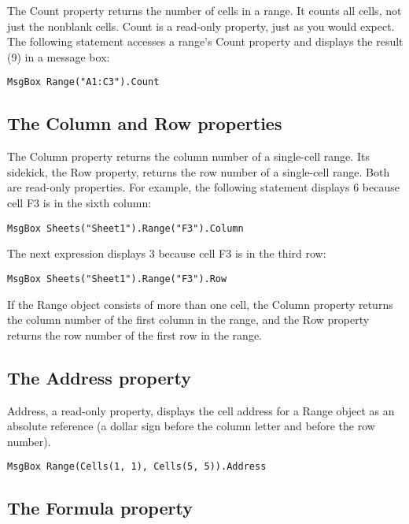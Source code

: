 \documentclass[
]{article}
\theoremstyle{definition}
\theoremstyle{definition}
\theoremstyle{definition}
\theoremstyle{definition}
\theoremstyle{remark}
\begin{document}
The Count property returns the number of cells in a range. It counts all cells, not just the nonblank cells. Count is a read-only property, just as you would expect. The following statement accesses a range's Count property and displays the result (9) in a message box:

\begin{verbatim}
MsgBox Range("A1:C3").Count
\end{verbatim}

\hypertarget{the-column-and-row-properties}{%
\subsection{The Column and Row properties}\label{the-column-and-row-properties}}

The Column property returns the column number of a single-cell range. Its sidekick, the Row property, returns the row number of a single-cell range. Both are read-only properties. For example, the following
statement displays 6 because cell F3 is in the sixth column:

\begin{verbatim}
MsgBox Sheets("Sheet1").Range("F3").Column
\end{verbatim}

The next expression displays 3 because cell F3 is in the third row:

\begin{verbatim}
MsgBox Sheets("Sheet1").Range("F3").Row
\end{verbatim}

If the Range object consists of more than one cell, the Column property
returns the column number of the first column in the range, and the Row
property returns the row number of the first row in the range.

\hypertarget{the-address-property}{%
\subsection{The Address property}\label{the-address-property}}

Address, a read-only property, displays the cell address for a Range
object as an absolute reference (a dollar sign before the column letter
and before the row number).

\begin{verbatim}
MsgBox Range(Cells(1, 1), Cells(5, 5)).Address
\end{verbatim}

\hypertarget{the-formula-property}{%
\subsection{The Formula property}\label{the-formula-property}}
\end{document}
